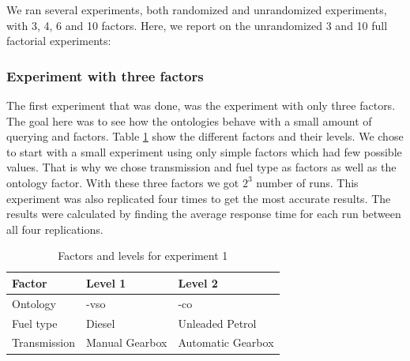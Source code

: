\documentclass{llncs}
\begin{document}
We ran several experiments, both randomized and unrandomized
experiments, with 3, 4, 6 and 10 factors. Here, we report on the
unrandomized 3 and 10 full factorial experiments:
  
\subsubsection{Experiment with three factors}
The first experiment that was done, was the experiment with only three
factors. The goal here was to see how the ontologies behave with a
small amount of querying and factors.  Table \ref{facandlevExp1} show
the different factors and their levels. We chose to start with a small
experiment using only simple factors which had few possible
values. That is why we chose transmission and fuel type as factors as
well as the ontology factor. With these three factors we got $2^3$
number of runs. This experiment was also replicated four times to get the
most accurate results.  The results were calculated by finding the
average response time for each run between all four replications.

\begin{table}[H]
\begin{center}
    \begin{tabular}{ | l | l l |}
    \hline
    {\bf Factor} & {\bf Level 1} & {\bf Level 2} \\ \hline
	Ontology & -vso & -co \\ \hline 
	Fuel type & Diesel & Unleaded Petrol \\ \hline 
	Transmission & Manual Gearbox & Automatic Gearbox \\ \hline 
    \end{tabular}
\end{center}
\caption{Factors and levels for experiment 1}\label{facandlevExp1}
\end{table}
\end{document}
